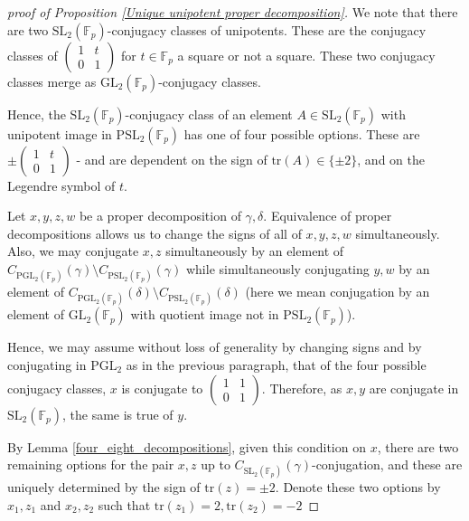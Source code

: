 \documentclass[letterpaper]{amsart}
\begin{document}
\begin{proof}[proof of Proposition \ref{Unique unipotent proper decomposition}]
We note that there are two $\mathrm{SL}_2(\mathbb{F}_p)$-conjugacy classes of unipotents. These are the conjugacy classes of $\begin{pmatrix}1 & t \\ 0 & 1\end{pmatrix}$ for $t \in \mathbb{F}_p$ a square or not a square. These two conjugacy classes merge as $\mathrm{GL}_2(\mathbb{F}_p)$-conjugacy classes.

Hence, the $\mathrm{SL}_2(\mathbb{F}_p)$-conjugacy class of an element $A \in \mathrm{SL}_2(\mathbb{F}_p)$ with unipotent image in $\mathrm{PSL}_2(\mathbb{F}_p)$ has one of four possible options. These are $\pm \begin{pmatrix} 1 & t \\ 0 & 1 \end{pmatrix}$ - and are dependent on the sign of $\mathrm{tr}(A) \in \{\pm 2\}$, and on the Legendre symbol of $t$.

Let $x, y, z, w$ be a proper decomposition of $\gamma,\delta$.
Equivalence of proper decompositions allows us to change the signs of all of $x,y,z,w$ simultaneously. Also, we may conjugate $x, z$ simultaneously by an element of $C_{\mathrm{PGL}_2(\mathbb{F}_p)}(\gamma)\setminus C_{\mathrm{PSL}_2(\mathbb{F}_p)}(\gamma)$ while simultaneously conjugating $y,w$ by an element of $C_{\mathrm{PGL}_2(\mathbb{F}_p)}(\delta) \setminus C_{\mathrm{PSL}_2(\mathbb{F}_p)}(\delta)$ (here we mean conjugation by an element of $\mathrm{GL}_2(\mathbb{F}_p)$ with quotient image not in $\mathrm{PSL}_2(\mathbb{F}_p)$).

Hence, we may assume without loss of generality by changing signs and by conjugating in $\mathrm{PGL}_2$ as in the previous paragraph, that of the four possible conjugacy classes, $x$ is conjugate to $\begin{pmatrix} 1 & 1 \\ 0 & 1\end{pmatrix}.$ Therefore, as $x,y$ are conjugate in $\mathrm{SL}_2(\mathbb{F}_p)$, the same is true of $y$.

By Lemma \ref{four_eight_decompositions}, given this condition on $x$, there are two remaining options for the pair $x,z$ up to $C_{\mathrm{SL}_2(\mathbb{F}_p)}(\gamma)$-conjugation, and these are uniquely determined by the sign of $\mathrm{tr}(z) = \pm 2.$ Denote these two options by $x_1, z_1$ and $x_2, z_2$ such that $\mathrm{tr}(z_1) = 2, \mathrm{tr}(z_2) = -2$


\end{proof}
\end{document}
